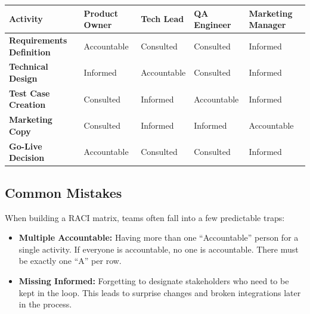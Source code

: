 \documentclass[
  11pt,
  openany,
  oneside]{book}
\providecommand{\tightlist}{%
  \setlength{\itemsep}{0pt}\setlength{\parskip}{0pt}}
\begin{document}
\begin{longtable}[]{@{}
  >{\raggedright\arraybackslash}p{}
  >{\raggedright\arraybackslash}p{}
  >{\raggedright\arraybackslash}p{}
  >{\raggedright\arraybackslash}p{}
  >{\raggedright\arraybackslash}p{}@{}}
\toprule\noalign{}
\begin{minipage}[b]{\linewidth}\raggedright
Activity
\end{minipage} & \begin{minipage}[b]{\linewidth}\raggedright
Product Owner
\end{minipage} & \begin{minipage}[b]{\linewidth}\raggedright
Tech Lead
\end{minipage} & \begin{minipage}[b]{\linewidth}\raggedright
QA Engineer
\end{minipage} & \begin{minipage}[b]{\linewidth}\raggedright
Marketing Manager
\end{minipage} \\
\midrule\noalign{}
\endhead
\bottomrule\noalign{}
\endlastfoot
\textbf{Requirements Definition} & Accountable & Consulted & Consulted &
Informed \\
\textbf{Technical Design} & Informed & Accountable & Consulted &
Informed \\
\textbf{Test Case Creation} & Consulted & Informed & Accountable &
Informed \\
\textbf{Marketing Copy} & Consulted & Informed & Informed &
Accountable \\
\textbf{Go-Live Decision} & Accountable & Consulted & Consulted &
Informed \\
\end{longtable}

\subsection{Common Mistakes}\label{common-mistakes}

When building a RACI matrix, teams often fall into a few predictable
traps:

\begin{itemize}
\tightlist
\item
  \textbf{Multiple Accountable:} Having more than one ``Accountable''
  person for a single activity. If everyone is accountable, no one is
  accountable. There must be exactly one ``A'' per row.
\item
  \textbf{Missing Informed:} Forgetting to designate stakeholders who
  need to be kept in the loop. This leads to surprise changes and broken
  integrations later in the process.
\end{itemize}
\end{document}
